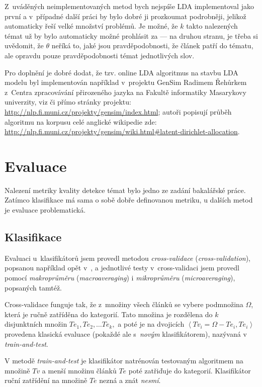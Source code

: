 \documentclass[12pt,a4paper]{report}
\begin{document}
Z~uváděných neimplementovaných metod bych nejspíše LDA implementoval jako první a v~případné další práci by bylo dobré ji prozkoumat podrobněji, jelikož automaticky řeší velké množství problémů. Je možné, že $k$ takto nalezených témat už by bylo automaticky možné prohlásit za  --- na druhou stranu, je třeba si uvědomit, že $\theta$ neříká to, jaké jsou pravděpodobnosti, že článek patří do tématu, ale opravdu pouze pravděpodobnosti témat jednotlivých slov.

Pro doplnění je dobré dodat, že tzv. online LDA algoritmus na stavbu LDA modelu byl implementován například v~projektu GenSim Radimem Řehůrkem z~Centra zpracovávání přirozeného jazyka na Fakultě informatiky Masarykovy univerzity, viz \cite{rehurek} či přímo stránky projektu: \url{http://nlp.fi.muni.cz/projekty/gensim/index.html}; autoři popisují průběh algoritmu na korpusu celé anglické wikipedie zde: \url{http://nlp.fi.muni.cz/projekty/gensim/wiki.html\#latent-dirichlet-allocation}.

\section{Evaluace}
\label{sec:evaluace}
Nalezení metriky kvality detekce témat bylo jedno ze zadání bakalářské práce. Zatímco klasifikace má sama o sobě dobře definovanou metriku, u dalších metod je evaluace problematická.

\subsection{Klasifikace}
\label{sec:evaluace_klasifikace}


Evaluaci u~klasifikátorů jsem provedl metodou \emph{cross-validace} (\emph{cross-va\-li\-da\-tion}), popsanou například opět v~\cite{machine_intro}, a jednotlivé testy v~cross-validaci jsem provedl pomocí \emph{makroprůměru} (\emph{macroaveraging}) i \emph{mikroprůměru} (\emph{microaveraging}), popsaných tamtéž.

Cross-validace funguje tak, že z~množiny všech článků se vybere podmnožina $\Omega$, která je ručně zatříděna do kategorií. Tato množina je rozdělena do $k$ disjunktních množin $Te_1, Te_2, \ldots Te_k,$ a poté je na dvojicích $\left<Tv_i=\Omega-Te_{i}, Te_{i}\right>$ provedena klasická evaluace (pokaždé ale s~\emph{novým} klasifikátorem), nazývaná v~\cite{machine_intro} \emph{train-and-test}.

V metodě \emph{train-and-test} je klasifikátor natrénován testovaným algoritmem na množině $Tv$ a menší množinu článků $Te$ poté zatřiďuje do kategorií. Klasifikátor ruční zatřídění na množině $Te$ nezná a znát \emph{nesmí}.
\end{document}
